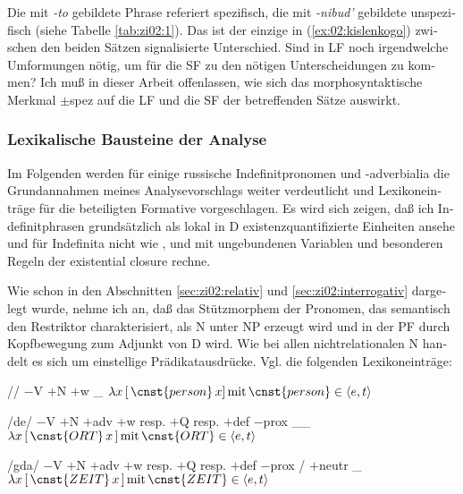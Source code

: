 \documentclass[output=paper, colorlinks, citecolor=brown, booklanguage=german]{langscibook}
\begin{document}
\begin{otherlanguage}{german}
\noindent Die mit \textit{-to} gebildete Phrase referiert spezifisch, die mit \textit{-nibud'} gebildete un\-spe\-zi\-fisch (siehe Tabelle \ref{tab:zi02:1}). Das ist der einzige in (\ref{ex:02:kislenkogo}) zwischen den beiden Sätzen signali\-sierte Unterschied. Sind in LF noch irgendwelche Umformungen nötig, um für die SF zu den nötigen Unterscheidungen zu kommen? Ich muß in dieser Arbeit offenlassen, wie sich das morphosyntaktische Merkmal $\pm$spez auf die LF und die SF der betreffenden Sätze auswirkt.

\subsubsection{Lexikalische Bausteine der Analyse}\label{sec:zi02:indefinit-2}
Im Folgenden werden für einige russische Indefinitpronomen und -adverbialia die Grundannahmen meines Analysevorschlags weiter verdeutlicht und Lexi\-kon\-ein\-trä\-ge für die beteiligten Formative vorgeschlagen. Es wird sich zeigen, daß ich Indefinitphrasen grundsätzlich als lokal in D existenzquantifizierte Einheiten ansehe und für Indefinita nicht wie \textcite{Heim1982}, \textcite{Diesing1992} und \mbox{\citet{Blaszczak2000}} mit ungebundenen Variablen und besonderen Regeln der existential closure rechne.

Wie schon in den Abschnitten \ref{sec:zi02:relativ} und \ref{sec:zi02:interrogativ} dargelegt wurde, nehme ich an, daß das Stützmorphem der Pronomen, das semantisch den Restriktor charakterisiert, als N unter NP erzeugt wird und in der PF durch Kopfbewegung zum Adjunkt von D wird. Wie bei allen nichtrelationalen N handelt es sich um einstellige Prädikatausdrücke. Vgl. die folgenden Lexikoneinträge: \enlargethispage{1\baselineskip}

\ea\label{ex:02:lex-null}
    \ea /\varnothing/
    \ex $-$V $+$N
    \ex $+$w \_
    \ex $\lambda x\, [\,\cnst{person} \, x]\, \textrm{mit}\, \cnst{person} \in \langle e,t\rangle$
\z\z 

\ea\label{ex:02:lex-de}
    \ea /de/
    \ex $-$V $+$N $+$adv
    \ex $+$w resp. $+$Q resp. $+$def $-$prox \_\_
    \ex $\lambda x\, [\,\cnst{ORT}\, x\,]\, \textrm{mit}\, \cnst{ORT} \in \langle e,t\rangle$
\z\z 

\ea\label{ex:02:lex-gda}
    \ea /gda/
    \ex $-$V $+$N $+$adv
    \ex $+$w resp. $+$Q resp. $+$def $-$prox / $+$neutr \_
    \ex $\lambda x\, [\,\cnst{ZEIT}\, x\,]\, \textrm{mit}\, \cnst{ZEIT} \in \langle e,t\rangle$
\z\z 


\end{otherlanguage}
\end{document}
